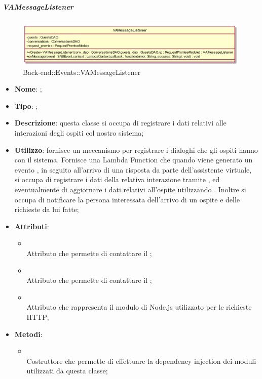 \hypertarget{VAMessageListener_label}{\subparagraph{VAMessageListener}}
\begin{figure}[h]
	\centering
	\includegraphics[width=\textwidth,height=\textheight,keepaspectratio]{images/ClassVAMessageListener.png}
	\caption{Back-end::Events::VAMessageListener}
\end{figure}
\begin{itemize}
	\item \textbf{Nome}: ;
	\item \textbf{Tipo}: ;
	\item \textbf{Descrizione}: questa classe si occupa di registrare i dati relativi alle interazioni degli ospiti col nostro sistema;
	\item \textbf{Utilizzo}: fornisce un meccanismo per registrare i dialoghi che gli ospiti hanno con il sistema. Fornisce una Lambda Function che quando viene generato un evento , in seguito all'arrivo di una risposta da parte dell'assistente virtuale, si occupa di registrare i dati della relativa interazione tramite , ed eventualmente di aggiornare i dati relativi all'ospite utilizzando . Inoltre si occupa di notificare la persona interessata dell'arrivo di un ospite e delle richieste da lui fatte;
	\item \textbf{Attributi}:
	\begin{itemize}
		\item[]  \\
		Attributo che permette di contattare il ;
		\item[]  \\
		Attributo che permette di contattare il ;
		\item[]  \\
		Attributo che rappresenta il modulo di Node.js utilizzato per le richieste HTTP;
	\end{itemize}
	\item \textbf{Metodi}:
	\begin{itemize}
		\item[]  \\		Costruttore che permette di effettuare la dependency injection dei moduli utilizzati da questa classe;\\

\end{itemize}
\end{itemize}
